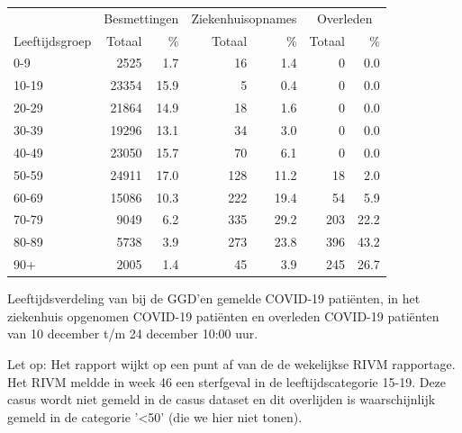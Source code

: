 \documentclass[
  english,
  man,floatsintext]{apa6}
\begin{document}
\begin{table}[H]
\centering\begingroup\fontsize{11}{13}\selectfont

\begin{threeparttable}
\begin{tabular}{lrrrrrr}
\toprule
\multicolumn{1}{c}{ } & \multicolumn{2}{c}{Besmettingen} & \multicolumn{2}{c}{Ziekenhuisopnames} & \multicolumn{2}{c}{Overleden} \\
\cmidrule(l{3pt}r{3pt}){2-3} \cmidrule(l{3pt}r{3pt}){4-5} \cmidrule(l{3pt}r{3pt}){6-7}
Leeftijdsgroep & Totaal & \% & Totaal & \% & Totaal & \%\\
\midrule
0-9 & 2525 & 1.7 & 16 & 1.4 & 0 & 0.0\\
10-19 & 23354 & 15.9 & 5 & 0.4 & 0 & 0.0\\
20-29 & 21864 & 14.9 & 18 & 1.6 & 0 & 0.0\\
30-39 & 19296 & 13.1 & 34 & 3.0 & 0 & 0.0\\
40-49 & 23050 & 15.7 & 70 & 6.1 & 0 & 0.0\\
50-59 & 24911 & 17.0 & 128 & 11.2 & 18 & 2.0\\
60-69 & 15086 & 10.3 & 222 & 19.4 & 54 & 5.9\\
70-79 & 9049 & 6.2 & 335 & 29.2 & 203 & 22.2\\
80-89 & 5738 & 3.9 & 273 & 23.8 & 396 & 43.2\\
90+ & 2005 & 1.4 & 45 & 3.9 & 245 & 26.7\\
\bottomrule
\end{tabular}
\begin{tablenotes}
\item[1] Leeftijdsverdeling van bij de GGD’en gemelde COVID-19 patiënten, in het ziekenhuis opgenomen COVID-19 patiënten en overleden COVID-19 patiënten van 10 december t/m 24 december 10:00 uur.
\item[2] Let op: Het rapport wijkt op een punt af van de de wekelijkse RIVM rapportage. Het RIVM meldde in week 46 een sterfgeval in de leeftijdscategorie 15-19. Deze casus wordt niet gemeld in de casus dataset en dit overlijden is waarschijnlijk gemeld in de categorie '<50' (die we hier niet tonen).
\end{tablenotes}
\end{threeparttable}
\endgroup{}
\end{table}

\newpage
\end{document}
